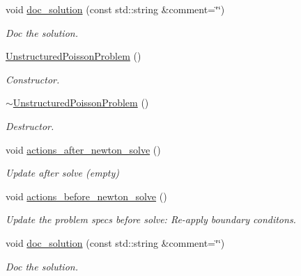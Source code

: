 \begin{DoxyCompactItemize}
void \hyperlink{classUnstructuredPoissonProblem_a9b21a3c3f574da71411f852006fe2a0c}{doc\+\_\+solution} (const std\+::string \&comment=\char`\"{}\char`\"{})
\begin{DoxyCompactList}\small\item\em Doc the solution. \end{DoxyCompactList}\item 
\hyperlink{classUnstructuredPoissonProblem_a26e7610a714aea17c9278beec4842371}{Unstructured\+Poisson\+Problem} ()
\begin{DoxyCompactList}\small\item\em Constructor. \end{DoxyCompactList}\item 
\hyperlink{classUnstructuredPoissonProblem_aeae85592e36ba7be6b4891fb49d2197b}{$\sim$\+Unstructured\+Poisson\+Problem} ()
\begin{DoxyCompactList}\small\item\em Destructor. \end{DoxyCompactList}\item 
void \hyperlink{classUnstructuredPoissonProblem_a822bd18e50ebeefd6d1c196fad7c0bf1}{actions\+\_\+after\+\_\+newton\+\_\+solve} ()
\begin{DoxyCompactList}\small\item\em Update after solve (empty) \end{DoxyCompactList}\item 
void \hyperlink{classUnstructuredPoissonProblem_a2ab9d23c0e6e6631ffe1a761f6bdf026}{actions\+\_\+before\+\_\+newton\+\_\+solve} ()
\begin{DoxyCompactList}\small\item\em Update the problem specs before solve\+: Re-\/apply boundary conditons. \end{DoxyCompactList}\item 
void \hyperlink{classUnstructuredPoissonProblem_a9b21a3c3f574da71411f852006fe2a0c}{doc\+\_\+solution} (const std\+::string \&comment=\char`\"{}\char`\"{})
\begin{DoxyCompactList}\small\item\em Doc the solution. \end{DoxyCompactList}\end{DoxyCompactItemize}
